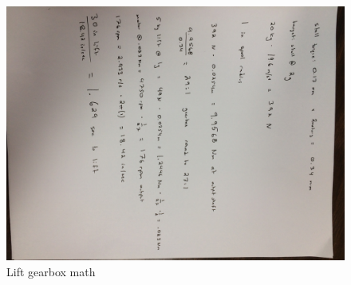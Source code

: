 \documentclass{article}
\begin{document}
\begin{figure}
    \centering
    \includegraphics[width=\textwidth, angle=90]{04_09-24/images/math.jpg}
    \caption{Lift gearbox math}
    \label{fig:my_label}
\end{figure}
\end{document}

